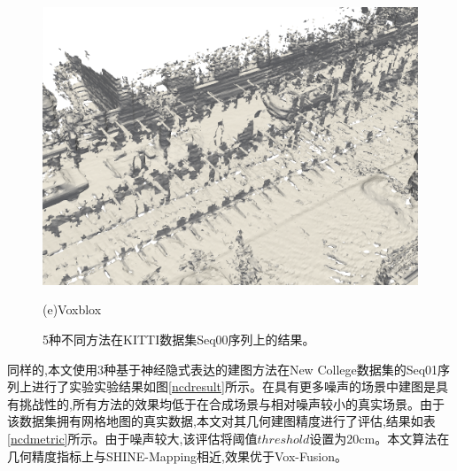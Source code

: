 \begin{figure}[htbp]
\begin{minipage}{0.5\linewidth}
    \includegraphics[width=1\linewidth]{figures/kitti_3_voxblox.png}
    \end{minipage}\caption*{(e)Voxblox}
    \caption{5种不同方法在KITTI数据集Seq00序列上的结果。}\label{kittiresult}
\end{figure}
同样的,本文使用3种基于神经隐式表达的建图方法在New College数据集的Seq01序列上进行了实验实验结果如图\ref{ncdresult}所示。在具有更多噪声的场景中建图是具有挑战性的,所有方法的效果均低于在合成场景与相对噪声较小的真实场景。由于该数据集拥有网格地图的真实数据,本文对其几何建图精度进行了评估,结果如表\ref{ncdmetric}所示。由于噪声较大,该评估将阈值$threshold$设置为20cm。本文算法在几何精度指标上与SHINE-Mapping相近,效果优于Vox-Fusion。
